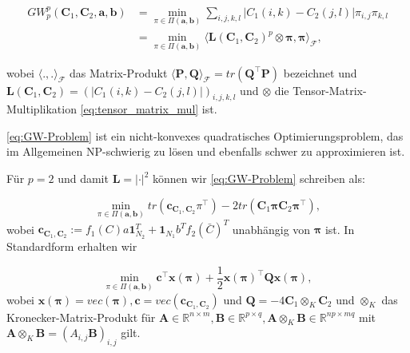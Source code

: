 \documentclass[11pt,a4paper]{article}
\numberwithin{equation}{section}
\begin{document}
	\begin{align}
		GW_p^p(\boldsymbol{C}_1, \boldsymbol{C}_2,\boldsymbol{a},\boldsymbol{b}) &= \min_{\pi \in \Pi(\boldsymbol{a}, \boldsymbol{b})}\sum_{i,j,k,l}{|C_1(i,k)- C_2(j,l)|\pi_{i,j}\pi_{k,l}}\\
		&=\min_{\pi \in \Pi(\boldsymbol{a}, \boldsymbol{b})} \langle \boldsymbol{L}(\boldsymbol{C}_1, \boldsymbol{C}_2)^p \otimes \boldsymbol{\pi}, \boldsymbol{\pi}\rangle_\mathcal{F},\label{eq:GW-Problem}
	\end{align}
	
	wobei $\langle .,.\rangle_\mathcal{F}$ das Matrix-Produkt $\langle \boldsymbol{P}, \boldsymbol{Q} \rangle_\mathcal{F}  = tr(\boldsymbol{Q}^\top\boldsymbol{P})$ bezeichnet und $\boldsymbol{L}(\boldsymbol{C}_1, \boldsymbol{C}_2) = (|C_1(i,k)-C_2(j,l)|)_{i,j,k,l}$ und $\otimes$ die Tensor-Matrix-Multiplikation \autoref{eq:tensor_matrix_mul} ist.
	
	\autoref{eq:GW-Problem} ist ein nicht-konvexes quadratisches Optimierungsproblem, das im Allgemeinen NP-schwierig zu lösen und ebenfalls schwer zu approximieren ist.
	
	Für $p=2$ und damit $\boldsymbol{L}=|\cdot|^2$ können wir \autoref{eq:GW-Problem} schreiben als:
	
	\begin{equation}
	\min_{\pi \in \Pi(\boldsymbol{a}, \boldsymbol{b})}{tr(\boldsymbol{c}_{\boldsymbol{C}_1,  \boldsymbol{C}_2}\pi^\top) - 2 tr(\boldsymbol{C}_1\boldsymbol{\pi}\boldsymbol{C}_2\boldsymbol{\pi}^\top)},
	\end{equation}
	wobei $\boldsymbol{c}_{\boldsymbol{C}_1,  \boldsymbol{C}_2}:= f_1(C)a \boldsymbol{1}_{N_2}^T + \boldsymbol{1}_{N_1}b^Tf_2(\bar{C})^T$ unabhängig von $\boldsymbol{\pi}$ ist.	
	In Standardform erhalten wir
	
	\begin{equation}
	\min_{\pi \in \Pi(\boldsymbol{a}, \boldsymbol{b})}{\boldsymbol{c}^\top \boldsymbol{x}(\boldsymbol{\pi}) + \frac{1}{2}\boldsymbol{x}(\boldsymbol{\pi})^\top \boldsymbol{Q}\boldsymbol{x}(\boldsymbol{\pi})},	 \label{eq:GW_p2}		
	\end{equation}
	wobei $\boldsymbol{x}(\boldsymbol{\pi}) = vec(\boldsymbol{\pi}), \boldsymbol{c}= vec(\boldsymbol{c}_{\boldsymbol{C}_1, \boldsymbol{C}_2})$ und $\boldsymbol{Q} = -4 \boldsymbol{C}_1 \otimes_K \boldsymbol{C}_2$ und $\otimes_K$ das Kronecker-Matrix-Produkt für $\boldsymbol{A} \in \mathbb{R}^{n\times m}, \boldsymbol{B} \in \mathbb{R}^{p\times q}, \boldsymbol{A}\otimes_K \boldsymbol{B} \in \mathbb{R}^{np \times mq}$ mit $\boldsymbol{A} \otimes_K \boldsymbol{B} = (A_{i,j}\boldsymbol{B})_{i,j}$ gilt. \\
	
\end{document}
